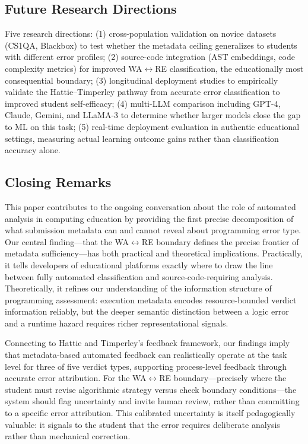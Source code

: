 \documentclass[acmsmall]{acmart}
\begin{document}
\subsection*{Future Research Directions}
Five research directions: (1) cross-population validation on novice datasets
(CS1QA, Blackbox) to test whether the metadata ceiling generalizes to
students with different error profiles; (2) source-code integration (AST
embeddings, code complexity metrics) for improved WA$\leftrightarrow$RE
classification, the educationally most consequential boundary; (3) longitudinal
deployment studies to empirically validate the Hattie--Timperley pathway from
accurate error classification to improved student self-efficacy; (4) multi-LLM
comparison including GPT-4, Claude, Gemini, and LLaMA-3 to determine whether
larger models close the gap to ML on this task; (5) real-time deployment
evaluation in authentic educational settings, measuring actual learning outcome
gains rather than classification accuracy alone.

\subsection*{Closing Remarks}

This paper contributes to the ongoing conversation about the role of automated
analysis in computing education by providing the first precise decomposition of
what submission metadata can and cannot reveal about programming error type.
Our central finding---that the WA$\leftrightarrow$RE boundary defines the
precise frontier of metadata sufficiency---has both practical and theoretical
implications. Practically, it tells developers of educational platforms exactly
where to draw the line between fully automated classification and
source-code-requiring analysis. Theoretically, it refines our understanding of
the information structure of programming assessment: execution metadata encodes
resource-bounded verdict information reliably, but the deeper semantic distinction
between a logic error and a runtime hazard requires richer representational
signals.

Connecting to Hattie and Timperley's feedback framework, our findings imply
that metadata-based automated feedback can realistically operate at the task
level for three of five verdict types, supporting process-level feedback through
accurate error attribution. For the WA$\leftrightarrow$RE boundary---precisely
where the student must revise algorithmic strategy versus check boundary
conditions---the system should flag uncertainty and invite human review, rather
than committing to a specific error attribution. This calibrated uncertainty
is itself pedagogically valuable: it signals to the student that the error
requires deliberate analysis rather than mechanical correction.
\end{document}
